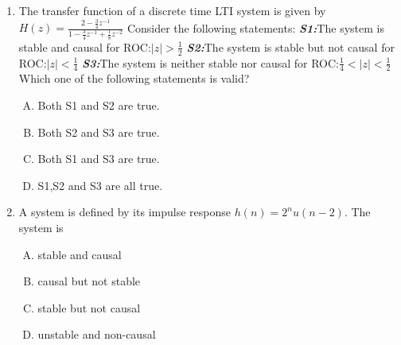 \documentclass[journal,12pt,twocolumn]{IEEEtran}
\begin{document}
\begin{enumerate}
\item The transfer function of a discrete time LTI system is given by $H(z)=\frac{2-\frac{3}{4}z^{-1}}{1-\frac{3}{4}z^{-1}+\frac{1}{8}z^{-2}}$ \newline Consider the following statements:
\newline \textbf{\textit{S1:}}The system is stable and causal for ROC:$|z|>\frac{1}{2}$
\newline \textbf{\textit{S2:}}The system is stable but not causal for ROC:$|z|<\frac{1}{4}$
\newline \textbf{\textit{S3:}}The system is neither stable nor  causal for ROC:$\frac{1}{4}<|z|<\frac{1}{2}$
\newline Which one of the following statements is valid?
\begin{enumerate}[(A)]

\setlength\itemsep{1em}

\item Both S1 and S2 are true.
\item Both S2 and S3 are true.
\item Both S1 and S3 are true.
\item S1,S2 and S3 are all true.

\end{enumerate}

%
%

\item A system is defined by its impulse response $h(n)=2^{n}u(n-2)$. The system is

\begin{enumerate}[(A)]
\setlength\itemsep{1em}

\item stable and causal
\item causal but not stable
\item stable but not causal
\item unstable and non-causal
\end{enumerate}


\end{enumerate}
\end{document}
